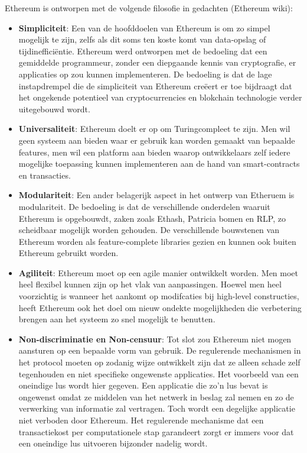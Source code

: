 			Ethereum is ontworpen met de volgende filosofie in gedachten (Ethereum wiki):
			\begin{itemize}
				\setlength\itemsep{1em}
				\item \textbf{Simpliciteit}: 
				Een van de hoofddoelen van Ethereum is om zo simpel mogelijk te zijn, zelfs als dit soms ten koste komt van data-opslag of tijdinefficiëntie. Ethereum werd ontworpen met de bedoeling dat een gemiddelde programmeur, zonder een diepgaande kennis van cryptografie, er applicaties op zou kunnen implementeren. De bedoeling is dat de lage instapdrempel die de simpliciteit van Ethereum creëert er toe bijdraagt dat het ongekende potentieel van cryptocurrencies en blokchain technologie verder uitegebouwd wordt.
				\item \textbf{Universaliteit}: Ethereum doelt er op om Turingcompleet te zijn. Men wil  geen systeem aan bieden waar er gebruik kan worden gemaakt van bepaalde features, men wil een platform aan bieden waarop ontwikkelaars zelf iedere mogelijke toepassing kunnen implementeren aan de hand van smart-contracts en transacties.
				\item \textbf{Modulariteit}: 
				Een ander belagerijk aspect in het ontwerp van Etheruem is modulariteit. De bedoeling is dat de verschillende onderdelen waaruit Ethereum is opgebouwdt, zaken zoals Ethash, Patricia bomen en RLP, zo scheidbaar mogelijk worden gehouden. De verschillende bouwstenen van Ethereum worden als feature-complete libraries gezien en kunnen ook buiten Ethereum gebruikt worden.
				\item \textbf{Agiliteit}: 
				Ethereum moet op een agile manier ontwikkelt worden. Men moet heel flexibel kunnen zijn op het vlak van aanpassingen. Hoewel men heel voorzichtig is wanneer het aankomt op modifcaties bij high-level constructies, heeft Ethereum ook het doel om nieuw ondekte mogelijkheden die verbetering brengen aan het systeem zo snel mogelijk te benutten.
				\item \textbf{Non-discriminatie en Non-censuur}: 
				Tot slot zou Ethereum niet mogen aansturen op een bepaalde vorm van gebruik. De regulerende mechanismen in het protocol moeten op zodanig wijze ontwikkelt zijn dat ze alleen schade zelf tegenhouden en niet specifieke ongewenste applicaties. Het voorbeeld van een oneindige lus wordt hier gegeven. Een applicatie die zo'n lus bevat is  ongewenst omdat ze middelen van het netwerk in beslag zal nemen en zo de verwerking van informatie zal vertragen. Toch wordt een degelijke applicatie niet verboden door Ethereum. Het regulerende mechanisme dat een transactiekost per computationele stap garandeert zorgt er immers voor dat een oneindige lus uitvoeren bijzonder nadelig wordt.
			\end{itemize}

